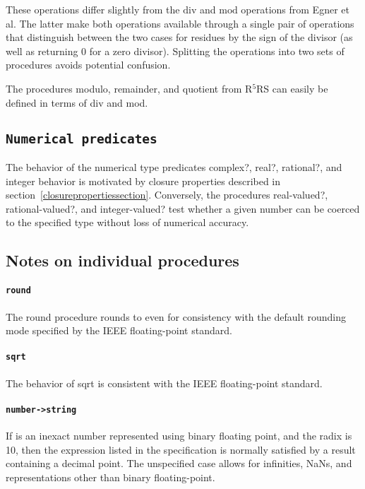 \documentclass[twoside,twocolumn]{algol60}
\newcommand{\rn}[1]{R$^{#1}$RS}
\begin{document}
These operations differ slightly from the $\mathrm{div}$ and
$\mathrm{mod}$ operations from Egner et al.  The latter make both operations
available through a single pair of operations that distinguish
between the two cases for residues by the sign of the divisor (as well
as returning $0$ for a zero divisor).  Splitting the operations into
two sets of procedures avoids potential confusion.

The procedures {\cf modulo}, {\cf remainder}, and {\cf quotient} from
\rn{5} can easily be defined in terms of {\cf div} and {\cf mod}.

\subsection{{\tt Numerical predicates}}

The behavior of the numerical type predicates {\cf complex?}, {\cf
  real?}, {\cf rational?}, and {\cf integer} behavior is motivated by
closure properties described in
section~\ref{closurepropertiessection}.  Conversely, the procedures
{\cf real-valued?}, {\cf rational-valued?}, and {\cf integer-valued?}
test whether a given number can be coerced to the specified type
without loss of numerical accuracy.

\subsection{Notes on individual procedures}

\paragraph{{\tt round}}

The {\cf round} procedure rounds to even for consistency with the
default rounding mode specified by the IEEE floating-point standard.

\paragraph{{\tt sqrt}}

The behavior of {\cf sqrt} is consistent with the IEEE floating-point
standard.

\paragraph{{\tt number->string}}

If  is an inexact number represented using binary floating
point, and the radix is 10, then the expression listed in the
specification is normally satisfied by a result containing a decimal
point.  The unspecified case allows for infinities, NaNs, and
representations other than binary floating-point.
\end{document}
